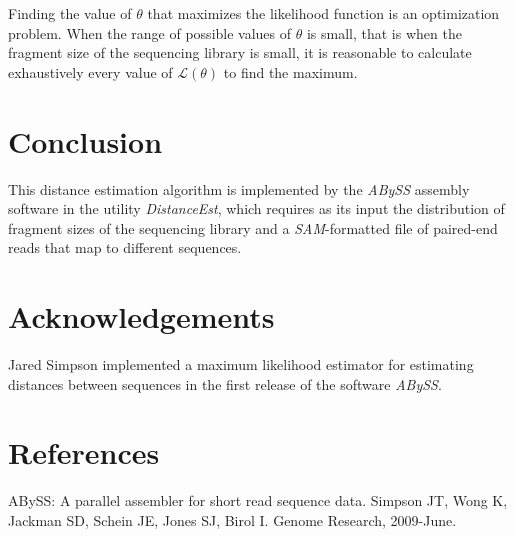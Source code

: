 \documentclass[letterpaper,12pt]{article}
\begin{document}
Finding the value of $\theta$ that maximizes the likelihood function
is an optimization problem. When the range of possible values of
$\theta$ is small, that is when the fragment size of the sequencing
library is small, it is reasonable to calculate exhaustively every
value of $\mathcal{L}(\theta)$ to find the maximum.

\section*{Conclusion}

This distance estimation algorithm is implemented by the
\textit{ABySS} assembly software in the utility \textit{DistanceEst},
which requires as its input the distribution of fragment sizes of the
sequencing library and a \textit{SAM}-formatted file of paired-end
reads that map to different sequences.

\section*{Acknowledgements}

Jared Simpson implemented a maximum likelihood estimator for
estimating distances between sequences in the first release of the
software \textit{ABySS}.

\section*{References}

ABySS: A parallel assembler for short read sequence data. Simpson JT,
Wong K, Jackman SD, Schein JE, Jones SJ, Birol I. Genome Research,
2009-June.
\end{document}
